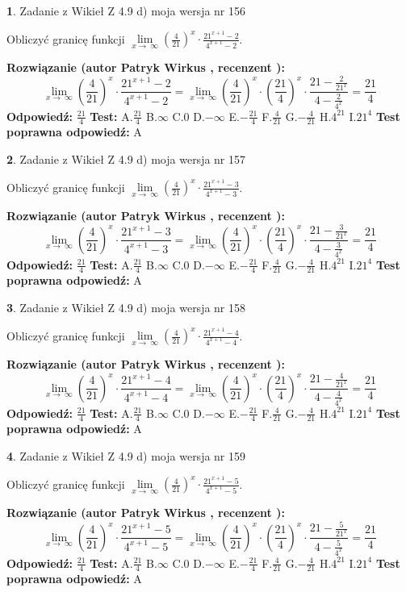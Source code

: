 \documentclass[12pt, a4paper]{article}
\theoremstyle{definition} %
\newtheorem{zad}{}
\newcommand{\zadStart}[1]{\begin{zad}#1\newline}
\newcommand{\zadStop}{\end{zad}}
\newcommand{\rozwStart}[2]{\noindent \textbf{Rozwiązanie (autor #1 , recenzent #2): }\newline}
\newcommand{\rozwStop}{\newline}
\newcommand{\odpStart}{\noindent \textbf{Odpowiedź:}\newline}
\newcommand{\odpStop}{\newline}
\newcommand{\testStart}{\noindent \textbf{Test:}\newline}
\newcommand{\testStop}{\newline}
\newcommand{\kluczStart}{\noindent \textbf{Test poprawna odpowiedź:}\newline}
\newcommand{\kluczStop}{\newline}
\begin{document}
\zadStart{Zadanie z Wikieł Z 4.9 d) moja wersja nr 156}


Obliczyć granicę funkcji  $\lim\limits_{x\to\ \infty}(\frac{4}{21})^{x}\cdot\frac{21^{x+1}-2}{4^{x+1}-2}$.
\zadStop
\rozwStart{Patryk Wirkus}{}
$$\lim\limits_{x\to\ \infty}(\frac{4}{21})^{x}\cdot\frac{21^{x+1}-2}{4^{x+1}-2}=\lim\limits_{x\to\ \infty}(\frac{4}{21})^{x}\cdot(\frac{21}{4})^{x} \cdot \frac{21-\frac{2}{21^{x}}}{4-\frac{2}{4^{x}}} = \frac{21}{4}$$
\rozwStop
\odpStart
$\frac{21}{4}$
\odpStop
\testStart
A.$\frac{21}{4}$ B.$\infty$ C.$0$ D.$-\infty$ E.$-\frac{21}{4}$
F.$\frac{4}{21}$ G.$-\frac{4}{21}$
H.$4^{21}$
I.$21^{4}$
\testStop
\kluczStart
A
\kluczStop



\zadStart{Zadanie z Wikieł Z 4.9 d) moja wersja nr 157}


Obliczyć granicę funkcji  $\lim\limits_{x\to\ \infty}(\frac{4}{21})^{x}\cdot\frac{21^{x+1}-3}{4^{x+1}-3}$.
\zadStop
\rozwStart{Patryk Wirkus}{}
$$\lim\limits_{x\to\ \infty}(\frac{4}{21})^{x}\cdot\frac{21^{x+1}-3}{4^{x+1}-3}=\lim\limits_{x\to\ \infty}(\frac{4}{21})^{x}\cdot(\frac{21}{4})^{x} \cdot \frac{21-\frac{3}{21^{x}}}{4-\frac{3}{4^{x}}} = \frac{21}{4}$$
\rozwStop
\odpStart
$\frac{21}{4}$
\odpStop
\testStart
A.$\frac{21}{4}$ B.$\infty$ C.$0$ D.$-\infty$ E.$-\frac{21}{4}$
F.$\frac{4}{21}$ G.$-\frac{4}{21}$
H.$4^{21}$
I.$21^{4}$
\testStop
\kluczStart
A
\kluczStop



\zadStart{Zadanie z Wikieł Z 4.9 d) moja wersja nr 158}


Obliczyć granicę funkcji  $\lim\limits_{x\to\ \infty}(\frac{4}{21})^{x}\cdot\frac{21^{x+1}-4}{4^{x+1}-4}$.
\zadStop
\rozwStart{Patryk Wirkus}{}
$$\lim\limits_{x\to\ \infty}(\frac{4}{21})^{x}\cdot\frac{21^{x+1}-4}{4^{x+1}-4}=\lim\limits_{x\to\ \infty}(\frac{4}{21})^{x}\cdot(\frac{21}{4})^{x} \cdot \frac{21-\frac{4}{21^{x}}}{4-\frac{4}{4^{x}}} = \frac{21}{4}$$
\rozwStop
\odpStart
$\frac{21}{4}$
\odpStop
\testStart
A.$\frac{21}{4}$ B.$\infty$ C.$0$ D.$-\infty$ E.$-\frac{21}{4}$
F.$\frac{4}{21}$ G.$-\frac{4}{21}$
H.$4^{21}$
I.$21^{4}$
\testStop
\kluczStart
A
\kluczStop



\zadStart{Zadanie z Wikieł Z 4.9 d) moja wersja nr 159}


Obliczyć granicę funkcji  $\lim\limits_{x\to\ \infty}(\frac{4}{21})^{x}\cdot\frac{21^{x+1}-5}{4^{x+1}-5}$.
\zadStop
\rozwStart{Patryk Wirkus}{}
$$\lim\limits_{x\to\ \infty}(\frac{4}{21})^{x}\cdot\frac{21^{x+1}-5}{4^{x+1}-5}=\lim\limits_{x\to\ \infty}(\frac{4}{21})^{x}\cdot(\frac{21}{4})^{x} \cdot \frac{21-\frac{5}{21^{x}}}{4-\frac{5}{4^{x}}} = \frac{21}{4}$$
\rozwStop
\odpStart
$\frac{21}{4}$
\odpStop
\testStart
A.$\frac{21}{4}$ B.$\infty$ C.$0$ D.$-\infty$ E.$-\frac{21}{4}$
F.$\frac{4}{21}$ G.$-\frac{4}{21}$
H.$4^{21}$
I.$21^{4}$
\testStop
\kluczStart
A
\kluczStop
\end{document}
